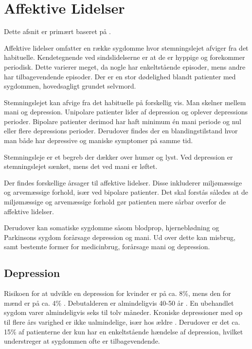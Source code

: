 
\section{Affektive Lidelser}\label{sec:affektivelidelser}
Dette afsnit er primært baseret på \citet{misc:affektivelidelser, misc:netpsykdepression, misc:netpsykmani}.

Affektive lidelser omfatter en række sygdomme hvor stemningslejet afviger fra det habituelle.
Kendetegnende ved sindslidelserne er at de er hyppige og forekommer periodisk.
Dette varierer meget, da nogle har enkeltstående episoder, mens andre har tilbagevendende episoder.
Der er en stor dødelighed blandt patienter med sygdommen, hovedsagligt grundet selvmord.

Stemningslejet kan afvige fra det habituelle på forskellig vis.
Man skelner mellem mani og depression.
Unipolare patienter lider af depression og oplever depressions perioder.
Bipolare patienter derimod har haft minimum én mani periode og nul eller flere depressions perioder.
Derudover findes der en blandingstilstand hvor man både har depressive og maniske symptomer på samme tid.


Stemningsleje er et begreb der dækker over humør og lyst.
Ved depression er stemningslejet sænket, mens det ved mani er løftet.

Der findes forskellige årsager til affektive lidelser. 
Disse inkluderer miljømæssige og arvemæssige forhold, især ved bipolare patienter.
Det skal forstås således at de miljømæssige og arvemæssige forhold gør patienten mere sårbar overfor de affektive lidelser.

Derudover kan somatiske sygdomme såsom blodprop, hjerneblødning og Parkinsons sygdom forårsage depression og mani.
Ud over dette kan misbrug, samt bestemte former for medicinbrug, forårsage mani og depression.

\subsection{Depression}
Risikoen for at udvikle en depression for kvinder er på ca. 8\%, mens den for mænd er på ca. 4\% \citep{misc:affektivelidelser}.
Debutalderen er almindeligvis 40-50 år \citep{misc:affektivelidelser}.
En ubehandlet sygdom varer almindeligvis seks til tolv måneder.
Kroniske depressioner med op til flere års varighed er ikke ualmindelige, især hos ældre \citep{misc:affektivelidelser}.
Derudover er det ca. 15\% af patienterne der kun har en enkeltstående hændelse af depression, hvilket understreger at sygdommen ofte er tilbagevendende.

